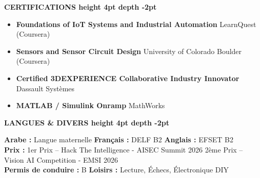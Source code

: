 \documentclass[10pt,a4paper]{altacv}
\renewcommand{\cvsection}[2][]{%
  \medskip%
  {\color{heading}\LARGE\bfseries #2 \hspace{0.2em}\leaders\vrule height 4pt depth -2pt\hfill\mbox{}}\par\smallskip
}
\begin{document}
\cvsection{CERTIFICATIONS}
\begin{itemize}[leftmargin=*, label=\textbullet, itemsep=2pt]
  \item \textbf{Foundations of IoT Systems and Industrial Automation} \hfill {\color{emphasis}LearnQuest (Coursera)}
  \item \textbf{Sensors and Sensor Circuit Design} \hfill {\color{emphasis}University of Colorado Boulder (Coursera)}
  \item \textbf{Certified 3DEXPERIENCE Collaborative Industry Innovator} \hfill {\color{emphasis}Dassault Systèmes}
  \item \textbf{MATLAB / Simulink Onramp} \hfill {\color{emphasis}MathWorks}
\end{itemize}

\cvsection{LANGUES \& DIVERS}
\textbf{Arabe :} Langue maternelle \hfill \textbf{Français :} DELF B2 \hfill \textbf{Anglais :} EFSET B2\\[2pt]
\textbf{Prix :} 1er Prix -- Hack The Intelligence - AISEC Summit 2026 \hfill 2ème Prix -- Vision AI Competition - EMSI 2026\\[2pt]
\textbf{Permis de conduire :} B \hfill \textbf{Loisirs :} Lecture, Échecs, Électronique DIY
\end{document}
